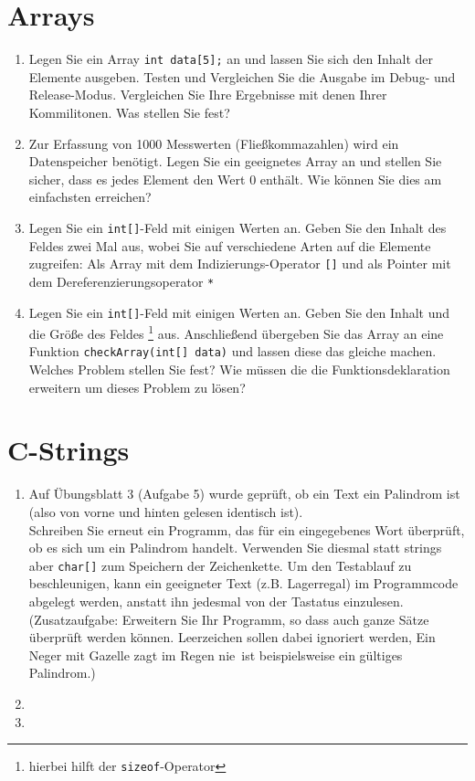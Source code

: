 \documentclass[paper=a4, fontsize=11pt, twoside]{scrartcl}
\begin{document}
\section*{Arrays}
\begin{enumerate}[resume]
  \item Legen Sie ein Array \texttt{int data[5];} an und lassen Sie sich den Inhalt der Elemente ausgeben. Testen und Vergleichen Sie die Ausgabe im Debug- und Release-Modus. Vergleichen Sie Ihre Ergebnisse mit denen Ihrer Kommilitonen. Was stellen Sie fest?
  \item Zur Erfassung von 1000 Messwerten (Fließkommazahlen) wird ein Datenspeicher benötigt. Legen Sie ein geeignetes Array an und stellen Sie sicher, dass es jedes Element den Wert 0 enthält. Wie können Sie dies am einfachsten erreichen?
  \item Legen Sie ein \texttt{int[]}-Feld mit einigen Werten an. Geben Sie den Inhalt des Feldes zwei Mal aus, wobei Sie auf verschiedene Arten auf die Elemente zugreifen: Als Array mit dem Indizierungs-Operator \texttt{[]} und als Pointer mit dem Dereferenzierungsoperator \texttt{*}
  \item Legen Sie ein \texttt{int[]}-Feld mit einigen Werten an. Geben Sie den Inhalt und die Größe des Feldes \footnote{hierbei hilft der \texttt{sizeof}-Operator} aus. Anschließend übergeben Sie das Array an eine Funktion \texttt{checkArray(int[] data)} und lassen diese das gleiche machen. Welches Problem stellen Sie fest? Wie müssen die die Funktionsdeklaration erweitern um dieses Problem zu lösen?
\end{enumerate}


\section*{C-Strings}
\begin{enumerate}
  \item Auf Übungsblatt 3 (Aufgabe 5) wurde geprüft, ob ein Text ein Palindrom ist (also von vorne und hinten gelesen identisch ist). \\
Schreiben Sie erneut ein Programm, das für ein eingegebenes Wort überprüft, ob es sich um ein Palindrom handelt. Verwenden Sie diesmal statt strings aber \texttt{char[]} zum Speichern der Zeichenkette. Um den Testablauf zu beschleunigen, kann ein geeigneter Text (z.B. \glqq Lagerregal\grqq) im Programmcode abgelegt werden, anstatt ihn jedesmal von der Tastatus einzulesen. (Zusatzaufgabe: Erweitern Sie Ihr Programm, so dass auch ganze Sätze überprüft werden können. Leerzeichen sollen dabei ignoriert werden, \glqq Ein Neger mit Gazelle zagt im Regen nie\grqq\, ist beispielsweise ein gültiges Palindrom.)
  \item 
  \item 
\end{enumerate}
\end{document}
